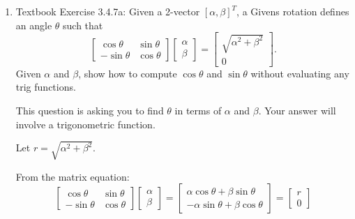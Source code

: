 \documentclass[reqno, answers]{exam}
\begin{document}
\begin{enumerate}
\begin{solution}
Taking $u = v$ works:
\[
Pv = v - 2\frac{v(v^T v)}{v^T v} = v - 2v = -v
\]

So $u = v$ (or any scalar multiple of $v$) satisfies $Pu = -u$.

\textbf{Part (b):} We want $Px = x$, which means:
\[
Px = x - 2\frac{v(v^T x)}{v^T v} = x
\]

This requires $\frac{v(v^T x)}{v^T v} = 0$, which means $v^T x = 0$.

The algebraic condition is: $v^T x = 0$, i.e., $x$ must be orthogonal to $v$.

In $n$ dimensions, the orthogonal complement of $v$ has dimension $n-1$. Therefore, there are $n-1$ linearly independent vectors satisfying $Px = x$.
\end{solution}

\item Textbook Exercise 3.4.7a: Given a 2-vector $[\alpha, \beta]^T$, a Givens rotation defines an angle $\theta$ such that
\[
\begin{bmatrix} \cos\theta & \sin\theta \\ -\sin\theta & \cos\theta \end{bmatrix} \begin{bmatrix} \alpha \\ \beta \end{bmatrix} = \begin{bmatrix} \sqrt{\alpha^2 + \beta^2} \\ 0 \end{bmatrix}.
\]
Given $\alpha$ and $\beta$, show how to compute $\cos\theta$ and $\sin\theta$ without evaluating any trig functions.

This question is asking you to find $\theta$ in terms of $\alpha$ and $\beta$. Your answer will involve a trigonometric function.

\begin{solution}
Let $r = \sqrt{\alpha^2 + \beta^2}$.

From the matrix equation:
\[
\begin{bmatrix} \cos\theta & \sin\theta \\ -\sin\theta & \cos\theta \end{bmatrix} \begin{bmatrix} \alpha \\ \beta \end{bmatrix} = \begin{bmatrix} \alpha\cos\theta + \beta\sin\theta \\ -\alpha\sin\theta + \beta\cos\theta \end{bmatrix} = \begin{bmatrix} r \\ 0 \end{bmatrix}
\]


\end{solution}
\end{enumerate}
\end{document}
